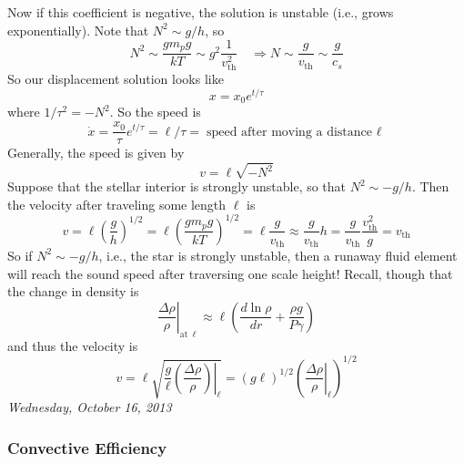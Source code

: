 \documentclass[10pt]{article}
\numberwithin{equation}{section}
\newcommand{\n}{\noindent}
\begin{document}
\n Now if this coefficient is negative, the solution is unstable
(i.e., grows exponentially). Note that $N^2\sim g/h$, so 
\begin{equation}
  \label{eq:30}
  N^2\sim\frac{gm_p
    g}{kT}\sim g^2\frac{1}{v_{\mathrm{th}}^2}\quad\Rightarrow N\sim \frac
{g}{v_{\mathrm{th}}}\sim\frac{g}{c_s}
\end{equation}
So our displacement solution looks like
\begin{equation}
  \label{eq:31}
  x=x_0e^{t/\tau}
\end{equation}
where $1/\tau^2=-N^2$. So the speed is 
\begin{equation}
  \label{eq:32}
  \dot{x}=\frac{x_0}{\tau}e^{t/\tau}=\ell/\tau=\textrm{speed after
    moving a distance $\ell$}
\end{equation}
Generally, the speed is given by
\begin{equation}
  \label{eq:33}
  v=\ell\sqrt{-N^2}
\end{equation}
Suppose that the stellar interior is strongly unstable, so that
$N^2\sim-g/h$. Then the velocity after traveling some length $\ell$ is 
\begin{equation}
  \label{eq:34}
  v=\ell\left(\frac{g}{h}\right)^{1/2}=\ell\left(\frac{gm_pg}{kT}\right)^
{1/2}=\ell\frac{g}{v_{\mathrm{th}}}\approx \frac{g}{v_{\mathrm{th}}}h=\frac
{g}{v_{\mathrm{th}}}\frac{v_{\mathrm{th}}^2}{g}=v_{\mathrm{th}}
\end{equation}
So if $N^2\sim -g/h$, i.e., the star is strongly unstable, then a runaway
fluid element will reach the sound speed after traversing one scale
height! Recall, though that the change in density is
\begin{equation}
  \label{eq:35}
 \left. \frac{\Delta\rho}{\rho}\right|_{\mathrm{at\ \ell}}\approx
 \ell\left(\frac{d\ln \rho}{dr}+\frac{\rho g}{P\gamma}\right)
\end{equation}
and thus the velocity is
\begin{equation}
  \label{eq:36}
  v=\ell\sqrt{\left.\frac{g}{\ell}\left(\frac{\Delta
        \rho}{\rho}\right)\right|_{\ell}}=(g\ell)^{1/2}\left(\left.\frac
{\Delta \rho}{\rho}\right|_{\ell}\right)^{1/2}
\end{equation}
\textit{Wednesday, October 16, 2013}\\

\subsubsection{Convective Efficiency}
\label{sec:conv-effic}
\end{document}

